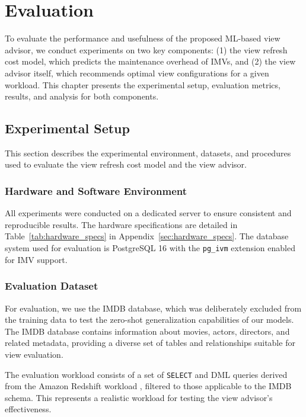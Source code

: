 \chapter{Evaluation}
\label{chap:evaluation}

To evaluate the performance and usefulness of the proposed \ac{ML}-based view advisor, we conduct experiments on two key components: (1) the view refresh cost model, which predicts the maintenance overhead of \acp{IMV}, and (2) the view advisor itself, which recommends optimal view configurations for a given workload. This chapter presents the experimental setup, evaluation metrics, results, and analysis for both components.

\section{Experimental Setup}
\label{sec:experimentalSetup}

This section describes the experimental environment, datasets, and procedures used to evaluate the view refresh cost model and the view advisor.

\subsection{Hardware and Software Environment}
\label{sec:hardware_setup}

All experiments were conducted on a dedicated server to ensure consistent and reproducible results. The hardware specifications are detailed in Table~\ref{tab:hardware_specs} in Appendix~\ref{sec:hardware_specs}. The database system used for evaluation is PostgreSQL 16 with the \texttt{pg\_ivm} extension enabled for \ac{IMV} support.

\subsection{Evaluation Dataset}
\label{sec:eval_dataset}

For evaluation, we use the IMDB database, which was deliberately excluded from the training data to test the zero-shot generalization capabilities of our models. The IMDB database contains information about movies, actors, directors, and related metadata, providing a diverse set of tables and relationships suitable for view evaluation.

The evaluation workload consists of a set of \texttt{SELECT} and \ac{DML} queries derived from the Amazon Redshift workload \cite{gupta2015amazon}, filtered to those applicable to the IMDB schema. This represents a realistic workload for testing the view advisor's effectiveness.

